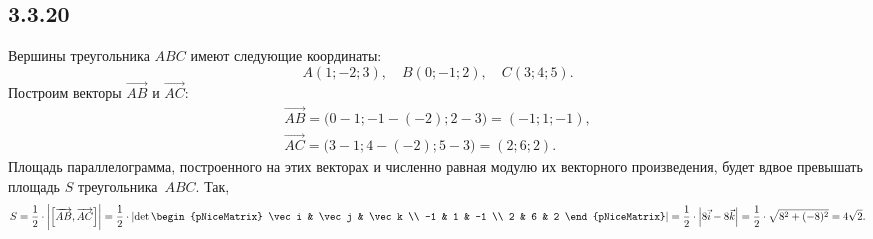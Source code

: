 \subsection{3.3.20}

Вершины треугольника $ABC$ имеют следующие координаты:
\[
A(1;-2;3),\quad B(0;-1;2),\quad C(3;4;5).
\]
Построим векторы $\overrightarrow{AB}$ и $\overrightarrow{AC}$:
\begin{gather*}
\overrightarrow{AB}=\bigl(0-1;-1-(-2);2-3\bigr)=(-1;1;-1), \\
\overrightarrow{AC}=\bigl(3-1;4-(-2);5-3\bigr)=(2;6;2).
\end{gather*}
Площадь параллелограмма, построенного на этих векторах и численно равная модулю их векторного произведения, будет вдвое превышать площадь $S$ треугольника~$ABC$. Так,
\[
S=\frac{1}{2}\cdot\biggl|\left[\overrightarrow{AB},\overrightarrow{AC}\right]\biggr|=\frac{1}{2}\cdot\left|\det
\begin{pNiceMatrix}
	\vec i & \vec j & \vec k \\
	-1 & 1 & -1 \\
	2 & 6 & 2
\end{pNiceMatrix}
\right|=\frac{1}{2}\cdot\left|8\vec i-8\vec k\right|=\frac{1}{2}\cdot\sqrt{8^2+(-8)^2}=4\sqrt{2}.
\]